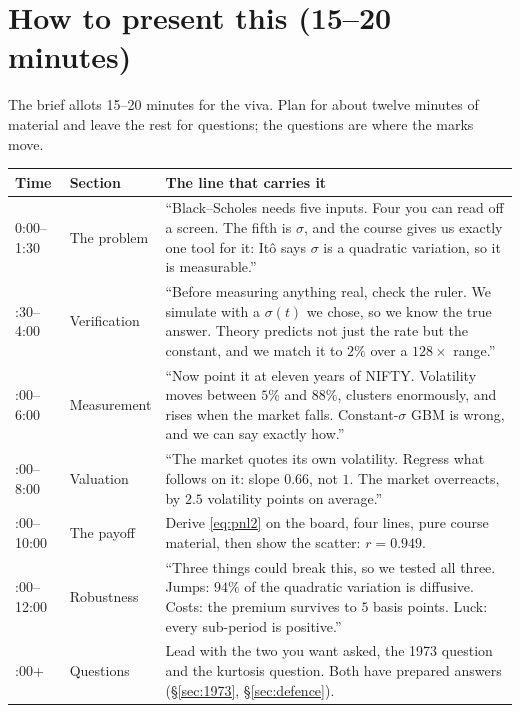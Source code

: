 \documentclass[11pt,a4paper]{article}
\begin{document}
\section{How to present this (15--20 minutes)}

The brief allots 15--20 minutes for the viva. Plan for about twelve minutes of material and
leave the rest for questions; the questions are where the marks move.

\begin{table}[H]
\centering\small
\begin{tabular}{L{1.5cm}L{4.0cm}L{9.6cm}}
\toprule
\textbf{Time} & \textbf{Section} & \textbf{The line that carries it} \\
:00--1:30 & The problem &
``Black--Scholes needs five inputs. Four you can read off a screen. The fifth is $\sigma$, and
the course gives us exactly one tool for it: It\^o says $\sigma$ is a quadratic variation, so
it is measurable.'' \\
:30--4:00 & Verification &
``Before measuring anything real, check the ruler. We simulate with a $\sigma(t)$ we chose, so
we know the true answer. Theory predicts not just the rate but the constant, and we match it
to $2\%$ over a $128\times$ range.'' \\
:00--6:00 & Measurement &
``Now point it at eleven years of NIFTY. Volatility moves between $5\%$ and $88\%$, clusters
enormously, and rises when the market falls. Constant-$\sigma$ GBM is wrong, and we can say
exactly how.'' \\
:00--8:00 & Valuation &
``The market quotes its own volatility. Regress what follows on it: slope $0.66$, not $1$. The
market overreacts, by $2.5$ volatility points on average.'' \\
:00--10:00 & The payoff &
Derive \eqref{eq:pnl2} on the board, four lines, pure course material, then show the
scatter: $r=0.949$. \\
:00--12:00 & Robustness &
``Three things could break this, so we tested all three. Jumps: $94\%$ of the quadratic
variation is diffusive. Costs: the premium survives to $5$ basis points. Luck: every
sub-period is positive.'' \\
:00+ & Questions &
Lead with the two you want asked, the 1973 question and the kurtosis question. Both have
prepared answers (\S\ref{sec:1973}, \S\ref{sec:defence}). \\
\bottomrule
\end{tabular}
\end{table}
\end{document}
